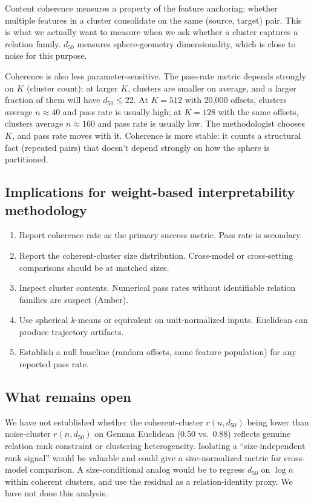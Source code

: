 \documentclass[11pt,letterpaper]{article}
\begin{document}
Content coherence measures a property of the feature anchoring: whether multiple features in a cluster consolidate on the same (source, target) pair. This is what we actually want to measure when we ask whether a cluster captures a relation family. $d_{50}$ measures sphere-geometry dimensionality, which is close to noise for this purpose.

Coherence is also less parameter-sensitive. The pass-rate metric depends strongly on $K$ (cluster count): at larger $K$, clusters are smaller on average, and a larger fraction of them will have $d_{50} \leq 22$. At $K = 512$ with 20{,}000 offsets, clusters average $n \approx 40$ and pass rate is usually high; at $K = 128$ with the same offsets, clusters average $n \approx 160$ and pass rate is usually low. The methodologist chooses $K$, and pass rate moves with it. Coherence is more stable: it counts a structural fact (repeated pairs) that doesn't depend strongly on how the sphere is partitioned.

\subsection{Implications for weight-based interpretability methodology}

\begin{enumerate}[leftmargin=*,itemsep=0pt]
\item Report coherence rate as the primary success metric. Pass rate is secondary.
\item Report the coherent-cluster size distribution. Cross-model or cross-setting comparisons should be at matched sizes.
\item Inspect cluster contents. Numerical pass rates without identifiable relation families are suspect (Amber).
\item Use spherical $k$-means or equivalent on unit-normalized inputs. Euclidean can produce trajectory artifacts.
\item Establish a null baseline (random offsets, same feature population) for any reported pass rate.
\end{enumerate}

\subsection{What remains open}

We have not established whether the coherent-cluster $r(n, d_{50})$ being lower than noise-cluster $r(n, d_{50})$ on Gemma Euclidean (0.50 vs.\ 0.88) reflects genuine relation rank constraint or clustering heterogeneity. Isolating a ``size-independent rank signal'' would be valuable and could give a size-normalized metric for cross-model comparison. A size-conditional analog would be to regress $d_{50}$ on $\log n$ within coherent clusters, and use the residual as a relation-identity proxy. We have not done this analysis.
\end{document}
